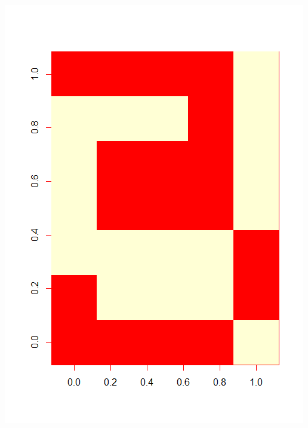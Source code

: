 \begin{minipage}{0.2\linewidth}
\includegraphics[width = \textwidth]{Figures/data3}

\end{minipage}
